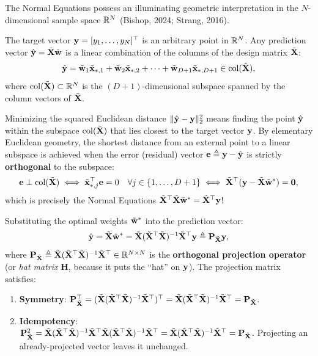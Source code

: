 The Normal Equations possess an illuminating geometric interpretation in the $N$-dimensional sample space $\mathbb{R}^N$ (Bishop, 2024; Strang, 2016). 

The target vector $\mathbf{y} = [y_1, \dots, y_N]^\top$ is an arbitrary point in $\mathbb{R}^N$. Any prediction vector $\hat{\mathbf{y}} = \tilde{\mathbf{X}}\tilde{\mathbf{w}}$ is a linear combination of the columns of the design matrix $\tilde{\mathbf{X}}$:
\begin{equation}
\hat{\mathbf{y}} = \tilde{\mathbf{w}}_1 \tilde{\mathbf{x}}_{*,1} + \tilde{\mathbf{w}}_2 \tilde{\mathbf{x}}_{*,2} + \dots + \tilde{\mathbf{w}}_{D+1} \tilde{\mathbf{x}}_{*,D+1} \in \operatorname{col}(\tilde{\mathbf{X}}),
\label{eq:col_space_comb}
\end{equation}
where $\operatorname{col}(\tilde{\mathbf{X}}) \subset \mathbb{R}^N$ is the $(D+1)$-dimensional subspace spanned by the column vectors of $\tilde{\mathbf{X}}$. 

Minimizing the squared Euclidean distance $\|\hat{\mathbf{y}} - \mathbf{y}\|_2^2$ means finding the point $\hat{\mathbf{y}}$ within the subspace $\operatorname{col}(\tilde{\mathbf{X}})$ that lies closest to the target vector $\mathbf{y}$. By elementary Euclidean geometry, the shortest distance from an external point to a linear subspace is achieved when the error (residual) vector $\mathbf{e} \triangleq \mathbf{y} - \hat{\mathbf{y}}$ is strictly \textbf{orthogonal} to the subspace:
\begin{equation}
\mathbf{e} \perp \operatorname{col}(\tilde{\mathbf{X}}) \iff \tilde{\mathbf{x}}_{*,j}^\top \mathbf{e} = 0 \quad \forall j \in \{1, \dots, D+1\} \iff \tilde{\mathbf{X}}^\top (\mathbf{y} - \tilde{\mathbf{X}}\tilde{\mathbf{w}}^*) = \mathbf{0},
\label{eq:orthogonality_condition}
\end{equation}
which is precisely the Normal Equations $\tilde{\mathbf{X}}^\top \tilde{\mathbf{X}} \tilde{\mathbf{w}}^* = \tilde{\mathbf{X}}^\top \mathbf{y}$!

Substituting the optimal weights $\tilde{\mathbf{w}}^*$ into the prediction vector:
\begin{equation}
\hat{\mathbf{y}} = \tilde{\mathbf{X}}\tilde{\mathbf{w}}^* = \tilde{\mathbf{X}}(\tilde{\mathbf{X}}^\top \tilde{\mathbf{X}})^{-1}\tilde{\mathbf{X}}^\top \mathbf{y} \triangleq \mathbf{P}_{\tilde{\mathbf{X}}} \mathbf{y},
\label{eq:projection_matrix}
\end{equation}
where $\mathbf{P}_{\tilde{\mathbf{X}}} \triangleq \tilde{\mathbf{X}}(\tilde{\mathbf{X}}^\top \tilde{\mathbf{X}})^{-1}\tilde{\mathbf{X}}^\top \in \mathbb{R}^{N \times N}$ is the \textbf{orthogonal projection operator} (or \textit{hat matrix} $\mathbf{H}$, because it puts the ``hat'' on $\mathbf{y}$). The projection matrix satisfies:
\begin{enumerate}[noitemsep,topsep=2pt,parsep=0pt,partopsep=0pt]
  \item \textbf{Symmetry}: $\mathbf{P}_{\tilde{\mathbf{X}}}^\top = (\tilde{\mathbf{X}}(\tilde{\mathbf{X}}^\top \tilde{\mathbf{X}})^{-1}\tilde{\mathbf{X}}^\top)^\top = \tilde{\mathbf{X}}(\tilde{\mathbf{X}}^\top \tilde{\mathbf{X}})^{-1}\tilde{\mathbf{X}}^\top = \mathbf{P}_{\tilde{\mathbf{X}}}$.
  \item \textbf{Idempotency}: $\mathbf{P}_{\tilde{\mathbf{X}}}^2 = \tilde{\mathbf{X}}(\tilde{\mathbf{X}}^\top \tilde{\mathbf{X}})^{-1}\tilde{\mathbf{X}}^\top \tilde{\mathbf{X}}(\tilde{\mathbf{X}}^\top \tilde{\mathbf{X}})^{-1}\tilde{\mathbf{X}}^\top = \tilde{\mathbf{X}}(\tilde{\mathbf{X}}^\top \tilde{\mathbf{X}})^{-1}\tilde{\mathbf{X}}^\top = \mathbf{P}_{\tilde{\mathbf{X}}}$. Projecting an already-projected vector leaves it unchanged.
\end{enumerate}

